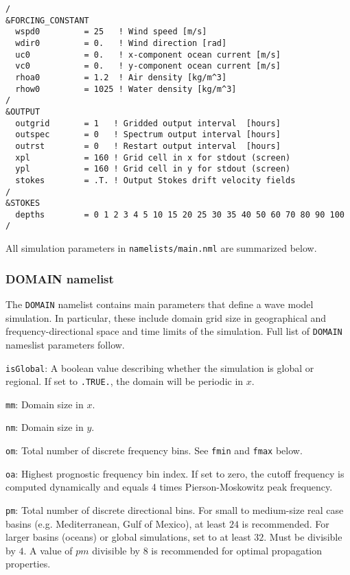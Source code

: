 \documentclass[letterpaper]{article}
\numberwithin{equation}{section}
\begin{document}
\begin{verbatim}
/
&FORCING_CONSTANT
  wspd0         = 25   ! Wind speed [m/s]
  wdir0         = 0.   ! Wind direction [rad]
  uc0           = 0.   ! x-component ocean current [m/s]
  vc0           = 0.   ! y-component ocean current [m/s]
  rhoa0         = 1.2  ! Air density [kg/m^3]
  rhow0         = 1025 ! Water density [kg/m^3]
/
&OUTPUT
  outgrid       = 1   ! Gridded output interval  [hours]
  outspec       = 0   ! Spectrum output interval [hours]
  outrst        = 0   ! Restart output interval  [hours]
  xpl           = 160 ! Grid cell in x for stdout (screen)
  ypl           = 160 ! Grid cell in y for stdout (screen)
  stokes        = .T. ! Output Stokes drift velocity fields
/
&STOKES
  depths        = 0 1 2 3 4 5 10 15 20 25 30 35 40 50 60 70 80 90 100
/

\end{verbatim}

All simulation parameters in \verb+namelists/main.nml+ are 
summarized below.

\subsubsection{DOMAIN namelist}

The \verb+DOMAIN+ namelist contains main parameters that define 
a wave model simulation.
In particular, these include domain grid size in geographical 
and frequency-directional space and time limits of the simulation.
Full list of \verb+DOMAIN+ nameslist parameters follow.

\verb+isGlobal+: 
A boolean value describing whether the simulation is global or regional.
If set to \verb+.TRUE.+, the domain will be periodic in $x$.

\verb+mm+:
Domain size in $x$.

\verb+nm+:
Domain size in $y$.

\verb+om+:
Total number of discrete frequency bins.
See \verb+fmin+ and \verb+fmax+ below.

\verb+oa+:
Highest prognostic frequency bin index. If set to zero, the cutoff
frequency is computed dynamically and equals 4 times Pierson-Moskowitz peak frequency.

\verb+pm+:
Total number of discrete directional bins.
For small to medium-size real case basins (e.g. Mediterranean, Gulf of Mexico), 
at least $24$ is recommended.
For larger basins (oceans) or global simulations, set to at least $32$.
Must be divisible by $4$.
A value of $pm$ divisible by $8$ is recommended for optimal propagation properties.
 
\end{document}
